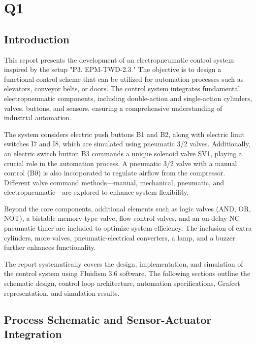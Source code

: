 \section{Q1} 

\subsection{Introduction} \label{sec:Introduction}

This report presents the development of an electropneumatic control system inspired by the 
setup "P3. EPM-TWD-2.3." The objective is to design a functional control scheme that can be
utilized for automation processes such as elevators, conveyor belts, or doors. The control system 
integrates fundamental electropneumatic components, including double-action and single-action cylinders, 
valves, buttons, and sensors, ensuring a comprehensive understanding of industrial automation.

The system considers electric push buttons B1 and B2, along with electric limit switches I7 
and I8, which are simulated using pneumatic 3/2 valves. Additionally, an electric switch button 
B3 commands a unique solenoid valve SV1, playing a crucial role in the automation process. A 
pneumatic 3/2 valve with a manual control (B0) is also incorporated to regulate airflow from the 
compressor. Different valve command methods—manual, mechanical, pneumatic, and electropneumatic—are 
explored to enhance system flexibility.

Beyond the core components, additional elements such as logic valves (AND, OR, NOT), a bistable
 memory-type valve, flow control valves, and an on-delay NC pneumatic timer are included to optimize 
 system efficiency. The inclusion of extra cylinders, more valves, pneumatic-electrical converters, a 
 lamp, and a buzzer further enhances functionality.

The report systematically covers the design, implementation, and simulation of the control system 
using Fluidism 3.6 software. The following sections outline the schematic design, control loop 
architecture, automation specifications, Grafcet representation, and simulation results.

\subsection{Process Schematic and Sensor-Actuator Integration} \label{sec:Process_Schematic_and_Sensor-Actuator_Integration}

